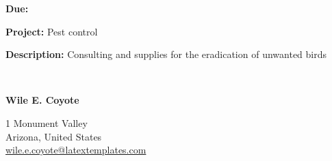 \documentclass[
	a4paper, %
	10pt, %
]{CSMinimalInvoice}
\begin{document}




\outputinvoicenum %

\begin{minipage}[t]{0.38\textwidth}
	\textbf{Due:}  %
	
	\textbf{Project:} Pest control %
	
	\textbf{Description:} Consulting and supplies for the eradication of unwanted birds %
\end{minipage}
\begin{minipage}[t]{0.03\textwidth}
	~ %
\end{minipage}
\begin{minipage}[t]{0.56\textwidth}
	\textbf{Wile E. Coyote} %
	
	1 Monument Valley \\ %
	Arizona, United States \\
	\href{mailto:wile.e.coyote@latextemplates.com}{wile.e.coyote@latextemplates.com} %
\end{minipage}



\vfill %

\end{document}
